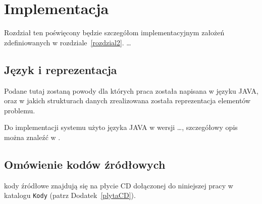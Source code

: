 \chapter{Implementacja}
\thispagestyle{chapterBeginStyle}

{\color{dgray}
Rozdział ten poświęcony będzie szczegółom implementacyjnym założeń zdefiniowanych w rozdziale~\ref{rozdzial2}. \ldots
}

\section{Język i reprezentacja}

{\color{dgray}
Podane tutaj zostaną powody dla których praca została napisana w języku JAVA, oraz w jakich strukturach danych zrealizowana została reprezentacja elementów problemu.
}

{\color{dgray}
Do implementacji systemu użyto języka JAVA w wersji \ldots, szczegółowy opis można znaleźć w \cite{Java}.
}

\section{Omówienie kodów źródłowych}

{\color{dgray}
kody źródłowe znajdują się na płycie CD dołączonej do niniejszej pracy w katalogu \texttt{Kody} (patrz Dodatek~\ref{plytaCD}).
}

